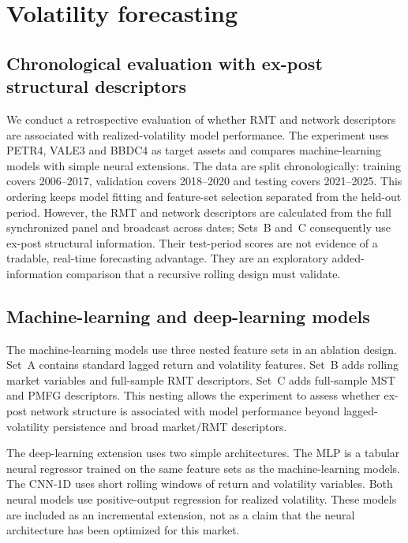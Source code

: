 \clearpage
\section{Volatility forecasting}
\label{sec:forecasting}

\subsection{Chronological evaluation with ex-post structural descriptors}

We conduct a retrospective evaluation of whether RMT and network descriptors are associated with realized-volatility model performance. The experiment uses PETR4, VALE3 and BBDC4 as target assets and compares machine-learning models with simple neural extensions. The data are split chronologically: training covers 2006--2017, validation covers 2018--2020 and testing covers 2021--2025. This ordering keeps model fitting and feature-set selection separated from the held-out period. However, the RMT and network descriptors are calculated from the full synchronized panel and broadcast across dates; Sets~B and~C consequently use ex-post structural information. Their test-period scores are not evidence of a tradable, real-time forecasting advantage. They are an exploratory added-information comparison that a recursive rolling design must validate.

\subsection{Machine-learning and deep-learning models}

The machine-learning models use three nested feature sets in an ablation design. Set~A contains standard lagged return and volatility features. Set~B adds rolling market variables and full-sample RMT descriptors. Set~C adds full-sample MST and PMFG descriptors. This nesting allows the experiment to assess whether ex-post network structure is associated with model performance beyond lagged-volatility persistence and broad market/RMT descriptors.

The deep-learning extension uses two simple architectures. The MLP is a tabular neural regressor trained on the same feature sets as the machine-learning models. The CNN-1D uses short rolling windows of return and volatility variables. Both neural models use positive-output regression for realized volatility. These models are included as an incremental extension, not as a claim that the neural architecture has been optimized for this market.

